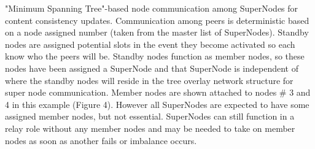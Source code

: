 \documentclass[oneside,12pt]{memoir}
\begin{document}
"Minimum Spanning Tree"-based node communication among SuperNodes for content consistency updates.  Communication among peers is deterministic based on a node assigned number (taken from the master list of SuperNodes).     Standby nodes are assigned potential slots in the event they become activated so each know who the peers will be.  Standby nodes function as member nodes, so these nodes have been assigned a SuperNode and that SuperNode is independent of where the standby nodes will reside in the tree overlay network structure for super node communication.  Member nodes are shown attached to nodes \# 3 and 4 in this example (Figure 4).  However all SuperNodes are expected to have some assigned member nodes, but not essential.  SuperNodes can still function in a relay role without any member nodes and may be needed to take on member nodes as soon as another fails or imbalance occurs. 
\end{document}
